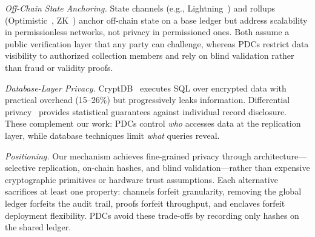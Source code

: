 \textit{Off-Chain State Anchoring.}
State channels (e.g., Lightning~\cite{lightning}) and rollups (Optimistic~\cite{optimistic-rollups}, ZK~\cite{zk-rollups}) anchor off-chain state on a base ledger but address scalability in permissionless networks, not privacy in permissioned ones. Both assume a public verification layer that any party can challenge, whereas PDCs restrict data visibility to authorized collection members and rely on blind validation rather than fraud or validity proofs.

\textit{Database-Layer Privacy.}
CryptDB~\cite{cryptdb} executes SQL over encrypted data with practical overhead (15--26\%) but progressively leaks information. Differential privacy~\cite{dwork-dp} provides statistical guarantees against individual record disclosure. These complement our work: PDCs control \textit{who} accesses data at the replication layer, while database techniques limit \textit{what} queries reveal.

\textit{Positioning.}
Our mechanism achieves fine-grained privacy through architecture---selective replication, on-chain hashes, and blind validation---rather than expensive cryptographic primitives or hardware trust assumptions. Each alternative sacrifices at least one property: channels forfeit granularity, removing the global ledger forfeits the audit trail, proofs forfeit throughput, and enclaves forfeit deployment flexibility. PDCs avoid these trade-offs by recording only hashes on the shared ledger.
